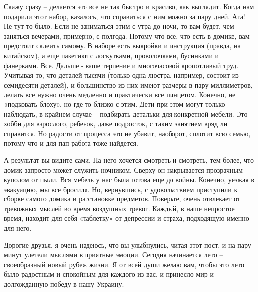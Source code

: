 Скажу сразу – делается это все не так быстро и красиво, как выглядит.
Когда нам подарили этот набор, казалось, что справиться с ним можно за
пару дней. Ага! Не тут-то было. Если не заниматься этим с утра до ночи, то
вам будет, чем заняться вечерами, примерно, с полгода. Потому что все, что
есть в домике, вам предстоит склеить самому. В наборе есть выкройки и
инструкция (правда, на китайском), а еще пакетики с лоскутками,
проволочками, бусинками и фанерками. Все. Дальше - ваше терпение и
многочасовой кропотливый труд.  Учитывая то, что деталей тысячи (только
одна люстра, например, состоит из семидесяти деталей), и большинство из
них имеют размеры в пару миллиметров, делать все нужно очень медленно и
практически все пинцетом. Конечно, не «подковать блоху», но где-то близко
с этим. Дети при этом могут только наблюдать, в крайнем случае – подбирать
детальки для конкретной мебели. Это хобби для взрослого, ребенок, даже
подросток, с таким занятием вряд ли справится. Но радости от процесса это
не убавит, наоборот, сплотит всю семью, потому что и для пап работа тоже
найдется.

А результат вы видите сами. На него хочется смотреть и смотреть, тем
более, что домик запросто может служить ночником. Сверху он накрывается
прозрачным куполом от пыли. Вся мебель у нас была готова еще до войны.
Конечно, уезжая в эвакуацию, мы все бросили. Но, вернувшись, с
удовольствием приступили к сборке самого домика и расстановке предметов.
Поверьте, очень отвлекает от тревожных мыслей во время воздушных тревог.
Каждый, в наше непростое время, находит для себя «таблетку» от депрессии и
страха, подходящую именно для него.

Дорогие друзья, я очень надеюсь, что вы улыбнулись, читая этот пост, и на
пару минут улетели мыслями в приятные эмоции. Сегодня начинается лето –
своеобразный новый рубеж жизни. Я от всей души желаю вам, чтобы это лето
было радостным и спокойным для каждого из вас, и принесло мир и
долгожданную победу в нашу Украину.

